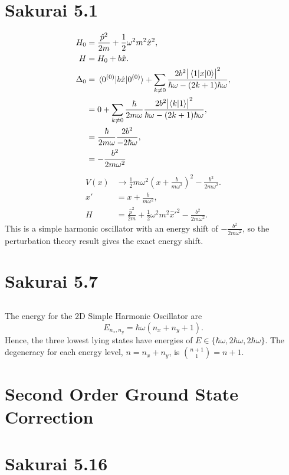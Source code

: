 \documentclass[
a4paper,
10pt,
twoside,
]{article}
\begin{document}
\titleinf
\maketitle
\startmcols

\section{Sakurai 5.1}
\begin{align}
	H_0 &= \frac{\hat{p}^2}{2m} + \frac{1}{2}\omega^2m^2\hat{x}^2,\\
	H &= H_0 + b\hat{x}.\\
	\Delta_0 &= \mel*{0^{(0)}}{b\hat{x}}{0^{(0)}} + \sum_{k \neq 0} \frac{2b^2 \abs{\mel*{1}{x}{0}}^2}{\hbar\omega - (2k+1)\hbar\omega},\\
	&= 0 + \sum_{k \neq 0} \frac{\hbar}{2m\omega}\frac{2b^2 \abs{\ip{k}{1}}^2}{\hbar\omega - (2k+1)\hbar\omega},\\
	&= \frac{\hbar}{2m\omega}\frac{2b^2}{-2\hbar\omega},\\
	&= -\frac{b^2}{2m\omega^2}
\end{align}
\begin{align}
	V(x) &\rightarrow \frac{1}{2}m \omega^2\left(x+\frac{b}{m\omega^2}\right)^2-\frac{b^2}{2m\omega^2}.\\
	x' &= x+\frac{b}{m\omega^2},\\
	H &= \frac{\hat{p}^2}{2m} + \frac{1}{2}\omega^2m^2\hat{x}'^2-\frac{b^2}{2m\omega^2}.
\end{align}
This is a simple harmonic oscillator with an energy shift of $-\frac{b^2}{2m\omega^2}$, so the perturbation theory result gives the exact energy shift.
\section{Sakurai 5.7}
\subsection{}
The energy for the 2D Simple Harmonic Oscillator are
\begin{equation}
	E_{n_x,n_y} = \hbar\omega\left(n_x+n_y+1\right).
\end{equation}
Hence, the three lowest lying states have energies of $E \in \{ \hbar\omega, 2\hbar\omega, 2\hbar\omega \}$.
The degeneracy for each energy level, $n = n_x+n_y$, is ${{n+1}\choose{1}} = n+1$.
\subsection{}
\subsection{}
\section{Second Order Ground State Correction}
\section{Sakurai 5.16}


\stopmcols
\end{document}
